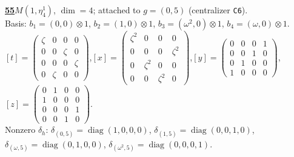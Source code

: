 \begin{samepage}\noindent\textbf{\underline{55}}\quad $M(1,\eta^{1}_{4})$, $\dim=4$; attached to $g=(0,5)$ (centralizer \texttt{C6}).\\
Basis: $b_{1}=(0,0)\otimes 1$, $b_{2}=(1,0)\otimes 1$, $b_{3}=(\omega^2,0)\otimes 1$, $b_{4}=(\omega,0)\otimes 1$.\\
$[t]=\left(\begin{smallmatrix} \zeta & 0 & 0 & 0 \\ 0 & 0 & \zeta & 0 \\ 0 & 0 & 0 & \zeta \\ 0 & \zeta & 0 & 0 \end{smallmatrix}\right)$,\quad $[x]=\left(\begin{smallmatrix} \zeta^2 & 0 & 0 & 0 \\ 0 & 0 & 0 & \zeta^2 \\ 0 & \zeta^2 & 0 & 0 \\ 0 & 0 & \zeta^2 & 0 \end{smallmatrix}\right)$,\quad $[y]=\left(\begin{smallmatrix} 0 & 0 & 0 & 1 \\ 0 & 0 & 1 & 0 \\ 0 & 1 & 0 & 0 \\ 1 & 0 & 0 & 0 \end{smallmatrix}\right)$,\quad $[z]=\left(\begin{smallmatrix} 0 & 1 & 0 & 0 \\ 1 & 0 & 0 & 0 \\ 0 & 0 & 0 & 1 \\ 0 & 0 & 1 & 0 \end{smallmatrix}\right)$.\\
Nonzero $\delta_h$: $\delta_{(0,5)}=\operatorname{diag}(1,0,0,0)$, $\delta_{(1,5)}=\operatorname{diag}(0,0,1,0)$, $\delta_{(\omega,5)}=\operatorname{diag}(0,1,0,0)$, $\delta_{(\omega^2,5)}=\operatorname{diag}(0,0,0,1)$.\end{samepage}
\medskip

